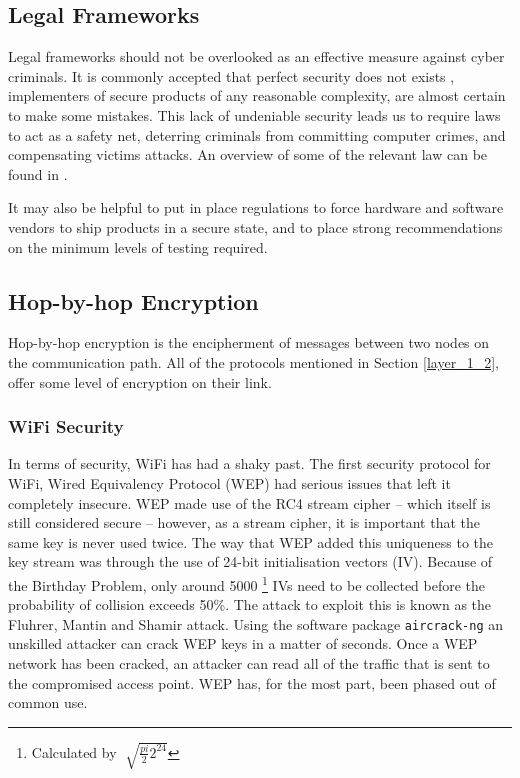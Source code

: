 \documentclass[10pt,journal,compsoc]{IEEEtran}
\begin{document}
\subsection{Legal Frameworks}
Legal frameworks should not be overlooked as an effective measure against cyber
criminals. It is commonly accepted that perfect security does not exists
\cite{ThereMustBeA}, implementers of secure products of any reasonable
complexity, are almost certain to make some mistakes. This lack of undeniable
security leads us to require laws to act as a safety net, deterring criminals
from committing computer crimes, and compensating victims attacks. An overview
of some of the relevant law can be found in \cite{Weber2010}. 

It may also be helpful to put in place regulations to force hardware and
software vendors to ship products in a secure state, and to place
strong recommendations on the minimum levels of testing required. 

\subsection{Hop-by-hop Encryption}
Hop-by-hop encryption is the encipherment of messages between two nodes on the
communication path. All of the  protocols mentioned in Section \ref{layer_1_2}, offer
some level of encryption on their link. 

\subsubsection{WiFi Security}
In terms of security, WiFi has had a shaky past. The first security protocol
for WiFi, Wired Equivalency Protocol (WEP) had serious issues that left it
completely insecure. WEP made use of the RC4 stream cipher -- which itself
is still considered secure -- however, as a stream cipher, it is important
that the same key is never used twice. The way that WEP added this
uniqueness to the key stream was through the use of 24-bit initialisation
vectors (IV). Because of the Birthday Problem, only around 5000
\footnote{Calculated by $\sqrt[]{\frac{pi}{2} 2^{24}} $} IVs need to be
collected before the probability of collision exceeds 50\%.  The attack to
exploit this is known as the Fluhrer, Mantin and Shamir attack. Using the
software package {\tt aircrack-ng} an unskilled attacker can crack WEP keys
in a matter of seconds. Once a WEP network has been cracked, an attacker
can read all of the traffic that is sent to the compromised access point.
WEP has, for the most part, been phased out of common use.
\end{document}
